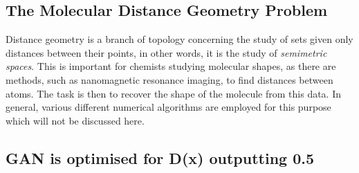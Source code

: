 \documentclass[12pt,a4paper]{article}
\begin{document}
\subsection{The Molecular Distance Geometry Problem} \label{app:molecular}
Distance geometry is a branch of topology concerning the study of sets given only distances between their points, in other words, it is the study of \emph{semimetric spaces}. This is important for chemists studying molecular shapes, as there are methods, such as nanomagnetic resonance imaging, to find distances between atoms. The task is then to recover the shape of the molecule from this data. In general, various different numerical algorithms are employed for this purpose \cite{liberti_molecular_2011} which will not be discussed here. 
\subsection{GAN is optimised for D(x) outputting 0.5 \cite{goodfellow_generative_2014}}\label{app:Dop}
\end{document}
